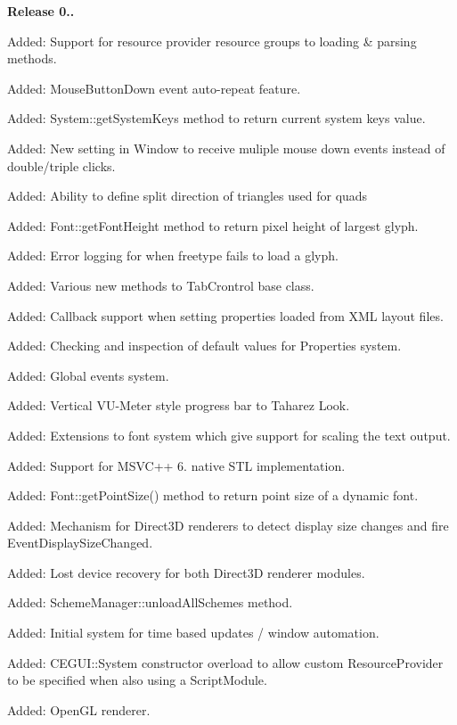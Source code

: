 {\bfseries{Release 0..}}
\begin{DoxyItemize}
\item Added\+: Support for resource provider resource groups to loading \& parsing methods.
\item Added\+: Mouse\+Button\+Down event auto-\/repeat feature.
\item Added\+: System\+::get\+System\+Keys method to return current system keys value.
\item Added\+: New setting in Window to receive muliple mouse down events instead of double/triple clicks.
\item Added\+: Ability to define split direction of triangles used for quads
\item Added\+: Font\+::get\+Font\+Height method to return pixel height of largest glyph.
\item Added\+: Error logging for when freetype fails to load a glyph.
\item Added\+: Various new methods to Tab\+Crontrol base class.
\item Added\+: Callback support when setting properties loaded from X\+ML layout files.
\item Added\+: Checking and inspection of default values for Properties system.
\item Added\+: Global events system.
\item Added\+: Vertical V\+U-\/\+Meter style progress bar to Taharez Look.
\item Added\+: Extensions to font system which give support for scaling the text output.
\item Added\+: Support for M\+S\+V\+C++ 6. native S\+TL implementation.
\item Added\+: Font\+::get\+Point\+Size() method to return point size of a dynamic font.
\item Added\+: Mechanism for Direct3D renderers to detect display size changes and fire Event\+Display\+Size\+Changed.
\item Added\+: Lost device recovery for both Direct3D renderer modules.
\item Added\+: Scheme\+Manager\+::unload\+All\+Schemes method.
\item Added\+: Initial system for time based updates / window automation.
\item Added\+: C\+E\+G\+U\+I\+::\+System constructor overload to allow custom Resource\+Provider to be specified when also using a Script\+Module.
\item Added\+: Open\+GL renderer.

\end{DoxyItemize}
